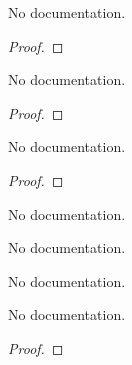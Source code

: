 \begin{theorem}\label{SubderivAt.add}
        \leanok
                No documentation.
    \end{theorem}

\begin{proof}
    \leanok
\end{proof}

\begin{theorem}\label{SubderivAt_of_norm_at_zero}
        \leanok
                No documentation.
    \end{theorem}

\begin{proof}
    \leanok
\end{proof}

\begin{theorem}\label{SubderivAt_abs}
        \leanok
                No documentation.
    \end{theorem}

\begin{proof}
    \leanok
\end{proof}

\begin{definition}\label{prox_prop}
        \leanok
                No documentation.
    \end{definition}

\begin{definition}\label{prox_set}
        \leanok
                No documentation.
    \end{definition}

\begin{definition}\label{prox_point}
        \leanok
                No documentation.
    \end{definition}

\begin{lemma}\label{strongconvex_of_convex_add_sq}
        \leanok
                No documentation.
    \end{lemma}

\begin{proof}
    \leanok
\end{proof}

